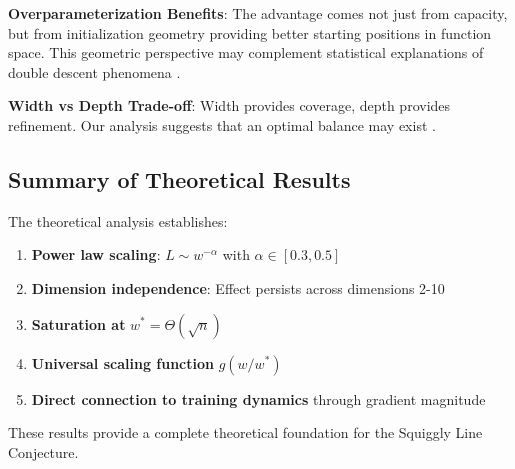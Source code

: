 \textbf{Overparameterization Benefits}: The advantage comes not just from capacity, but from initialization geometry providing better starting positions in function space. This geometric perspective may complement statistical explanations of double descent phenomena \cite{Zhang2016UnderstandingDL, Arora2019FineGrainedAO, Nakkiran2019DeepDD}.

\textbf{Width vs Depth Trade-off}: Width provides coverage, depth provides refinement. Our analysis suggests that an optimal balance may exist \cite{Telgarsky2016BenefitsOD, Hanin2019ComplexityOL}.

\subsection{Summary of Theoretical Results}

The theoretical analysis establishes:
\begin{enumerate}
    \item \textbf{Power law scaling}: $L \sim w^{-\alpha}$ with $\alpha \in [0.3, 0.5]$
    \item \textbf{Dimension independence}: Effect persists across dimensions 2-10
    \item \textbf{Saturation at} $w^* = \Theta(\sqrt{n})$
    \item \textbf{Universal scaling function} $g(w/w^*)$
    \item \textbf{Direct connection to training dynamics} through gradient magnitude
\end{enumerate}

These results provide a complete theoretical foundation for the Squiggly Line Conjecture.